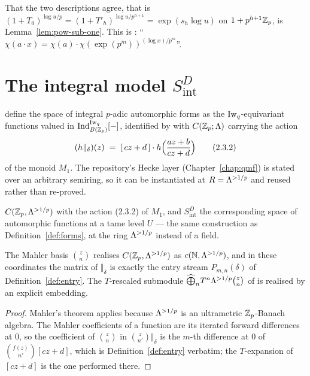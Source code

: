 That the two descriptions agree, that is
$(1+T_0)^{\log u/p} = (1+T'_h)^{\log u/p^{h+1}} = \exp(s_h\log u)$ on $1+p^{h+1}\mathbb{Z}_p$, is
Lemma~\ref{lem:pow-sub-one}.  This is \cite[\S2.1]{LWX}: ``$\chi(a\cdot x) =
\chi(a)\cdot\chi(\exp(p^{m}))^{(\log x)/p^{m}}$''.

\section{The integral model $S^{D}_{\mathrm{int}}$}
\label{sec:intmodel}

\cite[\S2.7]{LWX} define the space of integral $p$-adic automorphic forms as the
$\operatorname{Iw}_q$-equivariant functions valued in $\operatorname{Ind}^{\operatorname{Iw}_q}_{B(\mathbb{Z}_p)}[-]$, identified by
\cite[(2.3.1)]{LWX} with $C(\mathbb{Z}_p;\Lambda)$ carrying the action
\[
  (h\Vert_\delta)(z) \;=\; [\,cz+d\,]\cdot h\Bigl(\frac{az+b}{cz+d}\Bigr)
  \tag{2.3.2}
\]
of the monoid $M_1$.  The repository's Hecke layer (Chapter~\ref{chap:qmf}) is stated over an
arbitrary semiring, so it can be instantiated at $R = \Lambda^{>1/p}$ and reused rather than re-proved.

\begin{definition}
  \label{def:intforms}
  \leanok
  $C(\mathbb{Z}_p,\Lambda^{>1/p})$ with the action (2.3.2) of $M_1$, and $S^{D}_{\mathrm{int}}$ the corresponding
  space of automorphic functions at a tame level $U$ --- the same construction as
  Definition~\ref{def:forms}, at the ring $\Lambda^{>1/p}$ instead of a field.
\end{definition}

\begin{proposition}
  \label{prop:prop34}
  \leanok
  The Mahler basis $\binom{z}{n}$ realises $C(\mathbb{Z}_p,\Lambda^{>1/p})$ as $c(\mathbb{N},\Lambda^{>1/p})$, and in these
  coordinates the matrix of $\Vert_\delta$ is exactly the entry stream $P_{m,n}(\delta)$ of
  Definition~\ref{def:entry}.  The $T$-rescaled submodule
  $\widehat{\bigoplus}_n T^{n}\Lambda^{>1/p}\binom{z}{n}$ of \cite[(5.4.1)]{LWX} is realised by an
  explicit embedding.
\end{proposition}

\begin{proof}
  \leanok
  Mahler's theorem applies because $\Lambda^{>1/p}$ is an ultrametric $\mathbb{Z}_p$-Banach algebra.  The Mahler
  coefficients of a function are its iterated forward differences at $0$, so the coefficient of
  $\binom{z}{n}$ in $\binom{z}{n'}\Vert_\delta$ is the $m$-th difference at $0$ of
  $\binom{f(z)}{n'}[cz+d]$, which is Definition~\ref{def:entry} verbatim; the $T$-expansion of
  $[cz+d]$ is the one performed there.
\end{proof}

